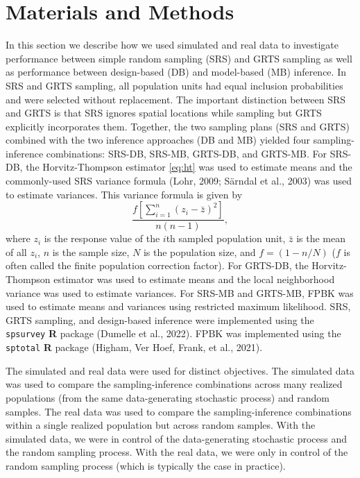 \documentclass[]{elsarticle} %
\begin{document}
\hypertarget{sec:mm}{%
\section{Materials and Methods}\label{sec:mm}}

In this section we describe how we used simulated and real data to
investigate performance between simple random sampling (SRS) and GRTS
sampling as well as performance between design-based (DB) and
model-based (MB) inference. In SRS and GRTS sampling, all population
units had equal inclusion probabilities and were selected without
replacement. The important distinction between SRS and GRTS is that SRS
ignores spatial locations while sampling but GRTS explicitly
incorporates them. Together, the two sampling plans (SRS and GRTS)
combined with the two inference approaches (DB and MB) yielded four
sampling-inference combinations: SRS-DB, SRS-MB, GRTS-DB, and GRTS-MB.
For SRS-DB, the Horvitz-Thompson estimator \eqref{eq:ht} was used to
estimate means and the commonly-used SRS variance formula (Lohr, 2009;
Särndal et al., 2003) was used to estimate variances. This variance
formula is given by \begin{equation}\label{equation:srs_var}
 \frac{f[\sum_{i = 1}^n (z_i - \bar{z})^2]}{n(n - 1)},
\end{equation} where \(z_i\) is the response value of the \(i\)th
sampled population unit, \(\bar{z}\) is the mean of all \(z_i\), \(n\)
is the sample size, \(N\) is the population size, and
\(f = (1 - n / N)\) (\(f\) is often called the finite population
correction factor). For GRTS-DB, the Horvitz-Thompson estimator was used
to estimate means and the local neighborhood variance was used to
estimate variances. For SRS-MB and GRTS-MB, FPBK was used to estimate
means and variances using restricted maximum likelihood. SRS, GRTS
sampling, and design-based inference were implemented using the
\texttt{spsurvey} \textbf{\textsf{R}} package (Dumelle et al., 2022).
FPBK was implemented using the \texttt{sptotal} \textbf{\textsf{R}}
package (Higham, Ver Hoef, Frank, et al., 2021).

The simulated and real data were used for distinct objectives. The
simulated data was used to compare the sampling-inference combinations
across many realized populations (from the same data-generating
stochastic process) and random samples. The real data was used to
compare the sampling-inference combinations within a single realized
population but across random samples. With the simulated data, we were
in control of the data-generating stochastic process and the random
sampling process. With the real data, we were only in control of the
random sampling process (which is typically the case in practice).
\end{document}
